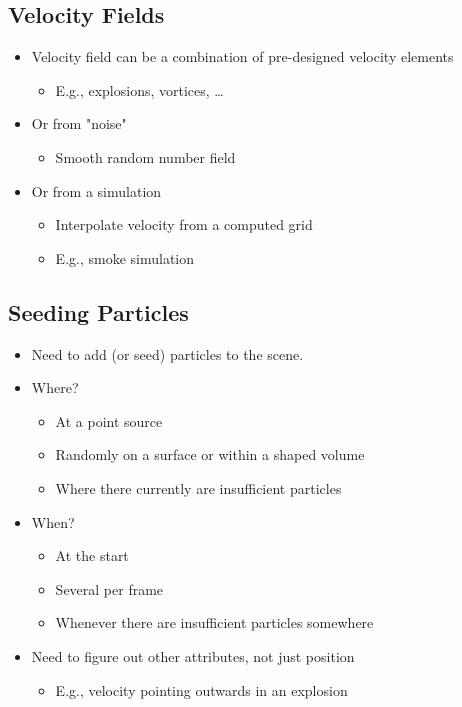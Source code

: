 \documentclass{article}
\begin{document}
\subsection*{Velocity Fields}
\begin{itemize}
    \item Velocity field can be a combination of pre-designed velocity elements
    \begin{itemize}
        \item E.g., explosions, vortices, \dots
    \end{itemize}
    \item Or from "noise"
    \begin{itemize}
        \item Smooth random number field
    \end{itemize}
    \item Or from a simulation
    \begin{itemize}
        \item Interpolate velocity from a computed grid
        \item E.g., smoke simulation
    \end{itemize}
\end{itemize}
\subsection*{Seeding Particles}
\begin{itemize}
    \item Need to add (or seed) particles to the scene.
    \item Where?
    \begin{itemize}
        \item At a point source
        \item Randomly on a surface or within a shaped volume
        \item Where there currently are insufficient particles
    \end{itemize}
    \item When?
    \begin{itemize}
        \item At the start
        \item Several per frame
        \item Whenever there are insufficient particles somewhere
    \end{itemize}
    \item Need to figure out other attributes, not just position
    \begin{itemize}
        \item E.g., velocity pointing outwards in an explosion
    \end{itemize}
\end{itemize}
\end{document}
